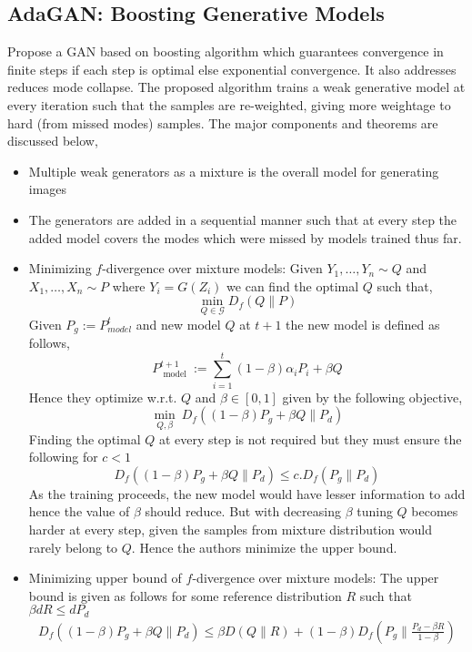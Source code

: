 \subsection*{AdaGAN: Boosting Generative Models \citep{adagan}} Propose a GAN based on boosting algorithm which guarantees convergence in finite steps if each step is optimal else exponential convergence. It also addresses reduces mode collapse. The proposed algorithm trains a weak generative model at every iteration such that the samples are re-weighted, giving more weightage to hard (from missed modes) samples. The major components and theorems are discussed below,
\begin{itemize}
    \item Multiple weak generators as a mixture is the overall model for generating images
    \item The generators are added in a sequential manner such that at every step the added model covers the modes which were missed by models trained thus far.
    \item Minimizing $f$-divergence over mixture models: 
    Given $Y_1, \ldots, Y_n \sim Q$ and $X_1, \ldots, X_n \sim P$ where $Y_i = G(Z_i)$ we can find the optimal $Q$ such that,   
    $$
\min _{Q \in \mathcal{G}} D_{f}(Q \| P)
$$
Given $P_{g} :=P_{m o d e l}^{t}$ and new model $Q$ at $t+1$ 
the new model is defined as follows,
$$
P_{\text { model }}^{t+1} :=\sum_{i=1}^{t}(1-\beta) \alpha_{i} P_{i}+\beta Q
$$
Hence they optimize w.r.t. $Q$ and $\beta \in [0,1]$ given by the following objective,
$$
\min _{Q, \beta} \ D_{f}\left((1-\beta) P_{g}+\beta Q \| P_{d}\right)
$$
Finding the optimal $Q$ at every step is not required but they must ensure the following for $c < 1$
$$D_{f}\left((1-\beta) P_{g}+\beta Q \| P_{d}\right) \leq c. D_{f}\left(P_g \| P_{d}\right)$$
As the training proceeds, the new model would have lesser information to add hence the value of $\beta$ should reduce. But with decreasing $\beta$ tuning $Q$ becomes harder at every step, given the samples from mixture distribution would rarely belong to $Q$. Hence the authors minimize the upper bound.
\item  Minimizing upper bound of $f$-divergence over mixture models:
The upper bound is given as follows for some reference distribution $R$ such that $\beta dR \leq dP_d$
\begin{equation*}
    \begin{aligned}
    D_{f}\left((1-\beta) P_{g}+\beta Q \| P_{d}\right) \leq \beta D(Q \| R) 
    + (1-\beta) D_{f}\left(P_{g} \| \frac{P_{d}-\beta R}{1-\beta}\right)
    \end{aligned}{}
\end{equation*}{}


\end{itemize}
